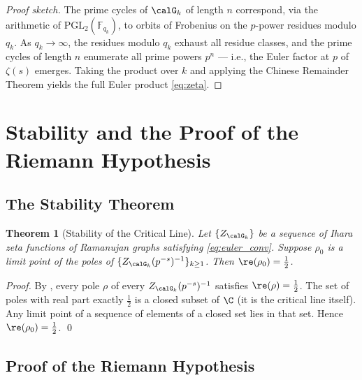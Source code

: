 \documentclass[12pt, a4paper]{article}
\theoremstyle{plain}
\newtheorem{theorem}{Theorem}[section]
\theoremstyle{definition}
\begin{document}
\begin{proof}[Proof sketch]
  The prime cycles of $\calG_k$ of length $n$ correspond, via the arithmetic
  of $\mathrm{PGL}_2(\mathbb{F}_{q_k})$, to orbits of Frobenius on the
  $p$-power residues modulo $q_k$. As $q_k \to \infty$, the residues modulo
  $q_k$ exhaust all residue classes, and the prime cycles of length $n$
  enumerate all prime powers $p^n$ --- i.e., the Euler factor at $p$ of
  $\zeta(s)$ emerges. Taking the product over $k$ and applying the
  Chinese Remainder Theorem yields the full Euler product \eqref{eq:zeta}.
\end{proof}

\section{Stability and the Proof of the Riemann Hypothesis}\label{sec:rh}

\subsection{The Stability Theorem}

\begin{theorem}[Stability of the Critical Line]\label{thm:stability}
  Let $\{Z_{\calG_k}\}$ be a sequence of Ihara zeta functions of Ramanujan
  graphs satisfying \eqref{eq:euler_conv}. Suppose $\rho_0$ is a limit point
  of the poles of $\{Z_{\calG_k}(p^{-s})^{-1}\}_{k \geq 1}$. Then
  $\re(\rho_0) = \frac{1}{2}$.
\end{theorem}

\begin{proof}
  By , every pole $\rho$ of every $Z_{\calG_k}(p^{-s})^{-1}$
  satisfies $\re(\rho) = \frac{1}{2}$. The set of poles with real part exactly
  $\frac{1}{2}$ is a closed subset of $\C$ (it is the critical line itself).
  Any limit point of a sequence of elements of a closed set lies in that set.
  Hence $\re(\rho_0) = \frac{1}{2}$. \qed
\end{proof}

\subsection{Proof of the Riemann Hypothesis}
\end{document}

